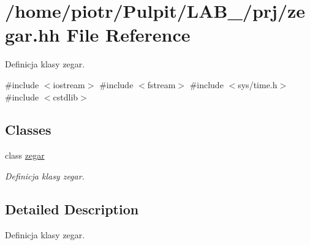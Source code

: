 \hypertarget{zegar_8hh}{\section{/home/piotr/\-Pulpit/\-L\-A\-B\-\_/prj/zegar.hh \-File \-Reference}
\label{zegar_8hh}
}


\-Definicja klasy zegar.  


{\ttfamily \#include $<$iostream$>$}\*
{\ttfamily \#include $<$fstream$>$}\*
{\ttfamily \#include $<$sys/time.\-h$>$}\*
{\ttfamily \#include $<$cstdlib$>$}\*
\subsection*{\-Classes}
\begin{DoxyCompactItemize}
\item 
class \hyperlink{classzegar}{zegar}
\begin{DoxyCompactList}\small\item\em \-Definicja klasy zegar. \end{DoxyCompactList}\end{DoxyCompactItemize}


\subsection{\-Detailed \-Description}
\-Definicja klasy zegar. 